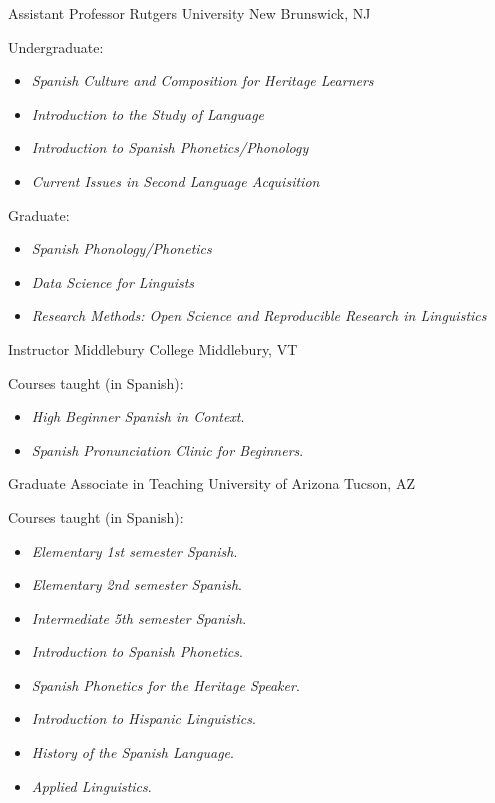 \documentclass[11pt,letterpaper]{assets/tex/moderncv}
\begin{document}
        {Assistant Professor}
        {Rutgers University}
        {New Brunswick, NJ}
        {}
        {
        Undergraduate:
        \begin{itemize}
            \item[] \small \emph{Spanish Culture and Composition for Heritage Learners}
            \item[] \small \emph{Introduction to the Study of Language}
            \item[] \small \emph{Introduction to Spanish Phonetics/Phonology}
            \item[] \small \emph{Current Issues in Second Language Acquisition}
        \end{itemize}
        Graduate:
        \begin{itemize}
            \item[] \small \emph{Spanish Phonology/Phonetics}
            \item[] \small \emph{Data Science for Linguists}
            \item[] \small \emph{Research Methods: Open Science and Reproducible 
                                 Research in Linguistics}
        \end{itemize}
        }
        {Instructor}
        {Middlebury College}
        {Middlebury, VT}
        {}
        {Courses taught (in Spanish):
        \begin{itemize}
          \item[] \small \emph{High Beginner Spanish in Context}.\vspace{-.03in}
          \item[] \small \emph{Spanish Pronunciation Clinic for Beginners}.
        \end{itemize}}
        {Graduate Associate in Teaching}
        {University of Arizona}
        {Tucson, AZ}
        {}
        {Courses taught (in Spanish):
        \begin{itemize}
          \item[] \small \emph{Elementary 1st semester Spanish}.\vspace{-.03in}
          \item[] \small \emph{Elementary 2nd semester Spanish}.\vspace{-.03in}
          \item[] \small \emph{Intermediate 5th semester Spanish}.\vspace{-.03in}
          \item[] \small \emph{Introduction to Spanish Phonetics}.\vspace{-.03in}
          \item[] \small \emph{Spanish Phonetics for the Heritage Speaker}.\vspace{-.03in}
          \item[] \small \emph{Introduction to Hispanic Linguistics}.\vspace{-.03in}
          \item[] \small \emph{History of the Spanish Language}.\vspace{-.03in}
          \item[] \small \emph{Applied Linguistics}.
        \end{itemize}}
\end{document}
